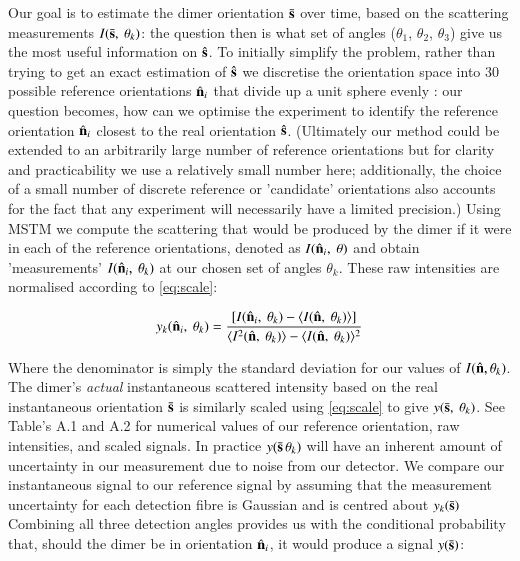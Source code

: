 \documentclass[final, 3p]{elsarticle}
\begin{document}
Our goal is to estimate the dimer orientation $\bar{\bf s}$ over time,
based on the scattering measurements $I(\bar{\bf s},\ \theta_k)$: the
question then is what set of angles ($\theta_1$, $\theta_2$,
$\theta_3$) give us the most useful information on $\hat{\bf s}$.  To
initially simplify the problem, rather than trying to get an exact
estimation of $\hat{\bf s}$ we discretise the orientation space into
$30$ possible reference orientations $\hat{\bf n}_i$ that divide up a
unit sphere evenly \cite{Rey2006}: our question becomes, how can we
optimise the experiment to identify the reference orientation
$\hat{\bf n}_i$ closest to the real orientation $\hat{\bf s}$.
(Ultimately our method could be extended to an arbitrarily large
number of reference orientations but for clarity and practicability we
use a relatively small number here; additionally, the choice of a
small number of discrete reference or 'candidate' orientations also
accounts for the fact that any experiment will necessarily have a
limited precision.)  Using MSTM we compute the scattering that would
be produced by the dimer if it were in each of the reference
orientations, denoted as $I(\hat{\bf n}_i, \ \theta)$ and obtain
'measurements' $I(\hat{\bf n}_i, \ \theta_k)$ at our chosen set of angles
$\theta_k$. These raw intensities are normalised according to
\eqref{eq:scale}:

\begin{align}
	\label{eq:scale}
	y_k(\hat{\bf n}_i,\ \theta_k) = 
	 \frac{\left[I(\hat{\bf n}_i, \ \theta_k)- \langle I(\hat{\bf n}, \ \theta_k) \rangle \right]} 
	{\langle I^2(\hat{\bf n},\ \theta_k) \rangle -\langle I(\hat{\bf n}, \ \theta_k)\rangle^2}
\end{align}

Where the denominator is simply the standard deviation for our values of $I(\hat{\bf n}, \theta_k)$. The dimer's \emph{actual}  instantaneous scattered intensity based on the real instantaneous orientation $\bar{\bf s}$  is similarly scaled using \eqref{eq:scale} to give $y(\bar{\bf s},\ \theta_k)$. See Table's A.1 and A.2 for numerical values of our reference orientation, raw intensities, and scaled signals. In practice $y(\bar{\bf s}\, \theta_k)$ will have an inherent amount of uncertainty in our measurement due to noise from our detector. We compare our instantaneous signal to our reference signal by assuming that the measurement uncertainty for each detection fibre is Gaussian and is centred about $y_k(\bar{\bf s})$ Combining all three detection angles provides us with the conditional probability that, should the dimer be in orientation $\hat{\bf n}_i$, it would produce a signal $y(\bar{\bf s})$:
\end{document}
